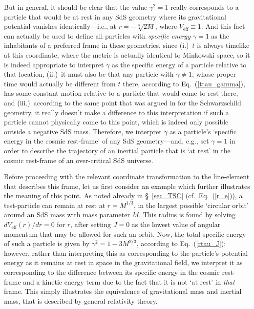 But in general, it should be clear that the value $\gamma^2=1$ really corresponds to a particle that would be at rest in any SdS geometry where its gravitational potential vanishes identically---i.e., at $r=-\sqrt[3]{2M}$, where $V_{\mathrm{eff}}\equiv1$. And this fact can actually be used to define all particles with \textit{specific energy} $\gamma=1$ as the inhabitants of a preferred frame in these geometries, since (i.)~$t$ is always timelike at this coordinate, where the metric is actually identical to Minkowski space, so it is indeed appropriate to interpret $\gamma$ as the specific energy of a particle relative to that location, (ii.)~it must also be that any particle with $\gamma\neq1$, whose proper time would actually be different from $t$ there, according to Eq.~(\ref{ttau_gamma}), has some constant motion relative to a particle that would come to rest there, and (iii.)~according to the same point that was argued in \cite{Misner1973} for the Schwarzschild geometry, it really doesn't make a difference to this interpretation if such a particle cannot physically come to this point, which is indeed only possible outside a negative SdS mass. Therefore, we interpret $\gamma$ as a particle's `specific energy in the cosmic rest-frame' of any SdS geometry---and, e.g., set $\gamma=1$ in order to describe the trajectory of an inertial particle that is `at rest' in the cosmic rest-frame of an over-critical SdS universe.

Before proceeding with the relevant coordinate transformation to the line-element that describes this frame, let us first consider an example which further illustrates the meaning of this point. As noted already in \S~\ref{sec_TSC} (cf.~Eq.~(\ref{r_e})), a test-particle can remain at rest at $r=M^{1/3}$, in the largest possible `circular orbit' around an SdS mass with mass parameter $M$. This radius is found by solving $dV_{\mathrm{eff}}(r)/dr=0$ for $r$, after setting $J=0$ as the lowest value of angular momentum that may be allowed for such an orbit. Now, the total specific energy of such a particle is given by $\gamma^2=1-3M^{2/3}$, according to Eq.~(\ref{rtau_J}); however, rather than interpreting this as corresponding to the particle's potential energy as it remains at rest in space in the gravitational field, we interpret it as corresponding to the difference between its specific energy in the cosmic rest-frame and a kinetic energy term due to the fact that it is not `at rest' in \textit{that} frame. This simply illustrates the equivalence of gravitational mass and inertial mass, that is described by general relativity theory.


